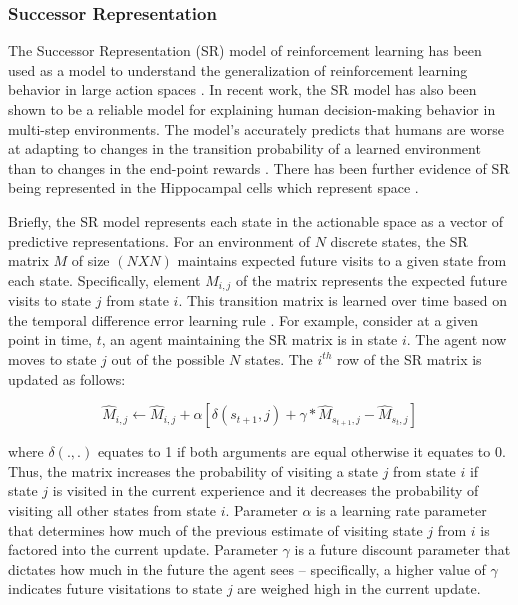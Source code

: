 \subsubsection*{Successor Representation}
\label{successor-representation}

The Successor Representation (SR) model of reinforcement learning has been used as a model to understand the generalization of reinforcement learning behavior in large action spaces \parencite{dayan1993improving}. In recent work, the SR model has also been shown to be a reliable model for explaining human decision-making behavior in multi-step environments. The model's  accurately predicts that humans are worse at adapting to changes in the transition probability of a learned environment than to changes in the end-point rewards \parencite{momennejad2017successor}. There has been further evidence of SR being represented in the Hippocampal cells which represent space \parencite{gershman2018successor, stachenfeld2017hippocampus}.

Briefly, the SR model represents each state in the actionable space as a vector of predictive representations. For an environment of $N$ discrete states, the SR matrix $M$ of size $(N X N)$ maintains expected future visits to a given state from each state. Specifically, element $M_{i,j}$ of the matrix represents the expected future visits to state $j$ from state $i$. This transition matrix is learned over time based on the temporal difference error learning rule \parencite{sutton2018reinforcement}. For example, consider at a given point in time, $t$, an agent maintaining the SR matrix is in state $i$. The agent now moves to state $j$ out of the possible $N$ states. The $i^{th}$ row of the SR matrix is updated as follows:

\begin{equation}
	\hat{M}_{i,j} \leftarrow \hat{M}_{i,j} + \alpha[\delta(s_{t+1},j) + \gamma*\hat{M}_{s_{t+1},j} - \hat{M}_{s_t,j}]
\end{equation}

where $\delta(., .)$ equates to 1 if both arguments are equal otherwise it equates to 0. Thus, the matrix increases the probability of visiting a state $j$ from state $i$ if state $j$ is visited in the current experience and it decreases the probability of visiting all other states from state $i$. Parameter $\alpha$ is a learning rate parameter that determines how much of the previous estimate of visiting state $j$ from $i$ is factored into the current update. Parameter $\gamma$ is a future discount parameter that dictates how much in the future the agent sees -- specifically, a higher value of $\gamma$ indicates future visitations to state $j$ are weighed high in the current update.

